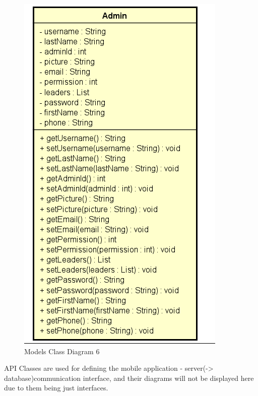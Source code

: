 \begin{figure}[H]
	\includegraphics[width=\linewidth]{diagrams/Models Class Diagram_6.png}
	\caption{Models Class Diagram 6}
	\label{fig:models_class_diag_6}
\end{figure}

API Classes are used for defining the mobile application - server(-> database)communication interface, and their diagrams will not be displayed here due to them being just interfaces.

